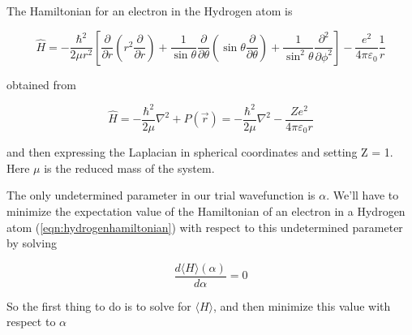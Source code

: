 

    \question

    The Hamiltonian for an electron in the Hydrogen atom is 

    \begin{equation}
        \label{eqn:hydrogenhamiltonian}
        \hat{H} = -\frac{\hbar^2}{2\mu r^2} \left[\frac{\partial}{\partial r}\left(r^2\frac{\partial}{\partial r}\right) + \frac{1}{\sin \theta}\frac{\partial}{\partial\theta}\left(\sin\theta \frac{\partial}{\partial \theta}\right) + \frac{1}{\sin^2\theta}\frac{\partial^2}{\partial \phi^2} \right] - \frac{e^2}{4\pi\varepsilon_0}\frac{1}{r}
    \end{equation}

    obtained from 

    \begin{equation*}
        \hat H = -\frac{\hbar^2}{2\mu}\nabla^2 + P(\vec r) = -\frac{\hbar^2}{2\mu}\nabla^2 - \frac{Ze^2}{4\pi\varepsilon_0 r}
    \end{equation*}

    and then expressing the Laplacian in spherical coordinates and setting Z =
    1. Here $\mu$ is the reduced mass of the system.
    
    The only undetermined parameter in our trial wavefunction is $\alpha$. We'll
    have to minimize the expectation value of the Hamiltonian of an electron in
    a Hydrogen atom (\ref{eqn:hydrogenhamiltonian}) with respect to this
    undetermined parameter by solving 

    \begin{equation}
        \label{eqn:variational}
        \frac{d\langle H \rangle(\alpha)}{d\alpha} = 0
    \end{equation}

    So the first thing to do is to solve for $\langle H \rangle$, and then
    minimize this value with respect to $\alpha$

